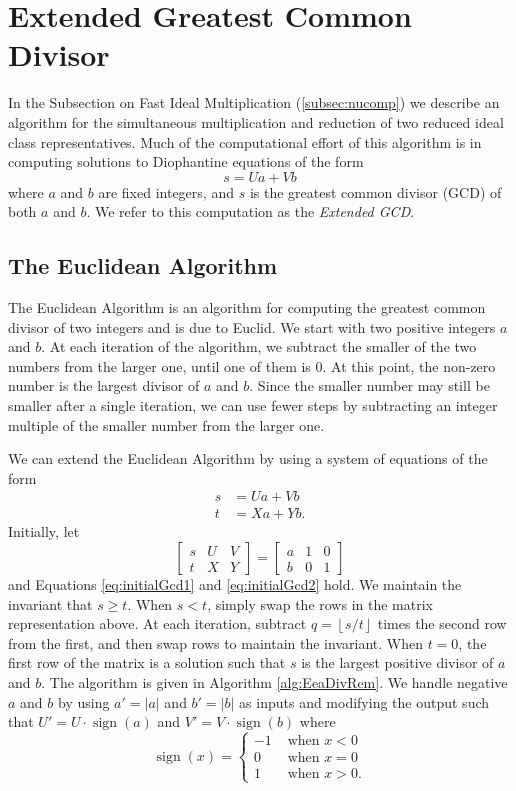 \documentclass{ucalgthes1}
\theoremstyle{definition}
\DeclareMathOperator{\sign}{sign}
\newcommand{\matrixThreeTwo}[6]{\left[ \begin{array}{rrr} #1 & #2 & #3 \\ #4 & #5 & #6 \end{array} \right]}
\newcommand{\floor}[1]{\left\lfloor #1 \right\rfloor}
\begin{document}
\section{Extended Greatest Common Divisor}
\label{sec:eea}

In the Subsection on Fast Ideal Multiplication (\ref{subsec:nucomp}) we describe an algorithm for the simultaneous multiplication and reduction of two reduced ideal class representatives.  Much of the computational effort of this algorithm is in computing solutions to Diophantine equations of the form
\[
	s = Ua + Vb
\]
where $a$ and $b$ are fixed integers, and $s$ is the greatest common divisor (GCD) of both $a$ and $b$.  We refer to this computation as the \emph{Extended GCD}.

\subsection{The Euclidean Algorithm}

The Euclidean Algorithm is an algorithm for computing the greatest common divisor of two integers and is due to Euclid.  We start with two positive integers $a$ and $b$.  At each iteration of the algorithm, we subtract the smaller of the two numbers from the larger one, until one of them is 0. At this point, the non-zero number is the largest divisor of $a$ and $b$.  Since the smaller number may still be smaller after a single iteration, we can use fewer steps by subtracting an integer multiple of the smaller number from the larger one.

We can extend the Euclidean Algorithm by using a system of equations of the form
\begin{align}
s &= Ua + Vb \label{eq:initialGcd1} \\
t &= Xa + Yb. \label{eq:initialGcd2}
\end{align}
Initially, let
\[
\matrixThreeTwo{s}{U}{V}{t}{X}{Y} = \matrixThreeTwo{a}{1}{0}{b}{0}{1}
\]
and Equations \ref{eq:initialGcd1} and \ref{eq:initialGcd2} hold.  We maintain the invariant that $s \ge t$.  When $s < t$, simply swap the rows in the matrix representation above.  At each iteration, subtract $q = \floor{s/t}$ times the second row from the first, and then swap rows to maintain the invariant.  When $t=0$, the first row of the matrix is a solution such that $s$ is the largest positive divisor of $a$ and $b$.  The algorithm is given in Algorithm \ref{alg:EeaDivRem}.  We handle negative $a$ and $b$ by using $a' = |a|$ and $b' = |b|$ as inputs and modifying the output such that $U' = U \cdot \sign(a)$ and $V' = V \cdot \sign(b)$ where
\[
	\sign(x) = \begin{cases}
		-1 & \textrm{ when } x < 0 \\
		0 & \textrm{ when } x = 0 \\
		1 & \textrm{ when } x > 0.
	\end{cases}
\]
\end{document}
